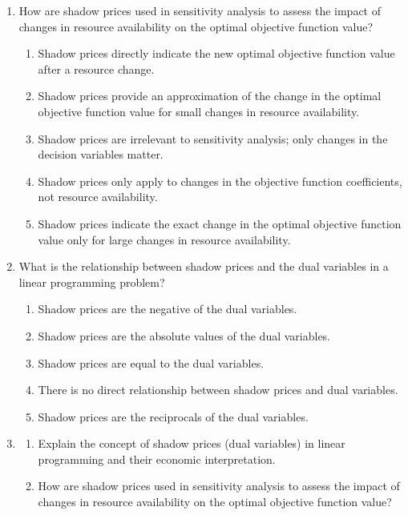 \documentclass{article}%
\begin{document}
\begin{enumerate}
\begin{enumerate}
\end{enumerate}%
\vspace{1em}%
\item How are shadow prices used in sensitivity analysis to assess the impact of changes in resource availability on the optimal objective function value?%
\begin{enumerate}%
\item Shadow prices directly indicate the new optimal objective function value after a resource change.%
\item Shadow prices provide an approximation of the change in the optimal objective function value for small changes in resource availability.%
\item Shadow prices are irrelevant to sensitivity analysis; only changes in the decision variables matter.%
\item Shadow prices only apply to changes in the objective function coefficients, not resource availability.%
\item Shadow prices indicate the exact change in the optimal objective function value only for large changes in resource availability.%
\end{enumerate}%
\vspace{1em}%
\item What is the relationship between shadow prices and the dual variables in a linear programming problem?%
\begin{enumerate}%
\item Shadow prices are the negative of the dual variables.%
\item Shadow prices are the absolute values of the dual variables.%
\item Shadow prices are equal to the dual variables.%
\item There is no direct relationship between shadow prices and dual variables.%
\item Shadow prices are the reciprocals of the dual variables.%
\end{enumerate}%
\vspace{1em}%
\item%
\begin{enumerate}%
\item Explain the concept of shadow prices (dual variables) in linear programming and their economic interpretation.%
\begin{enumerate}%
\end{enumerate}%
\vspace{0.5em}%
\item How are shadow prices used in sensitivity analysis to assess the impact of changes in resource availability on the optimal objective function value?%

\end{enumerate}
\end{enumerate}
\end{document}

